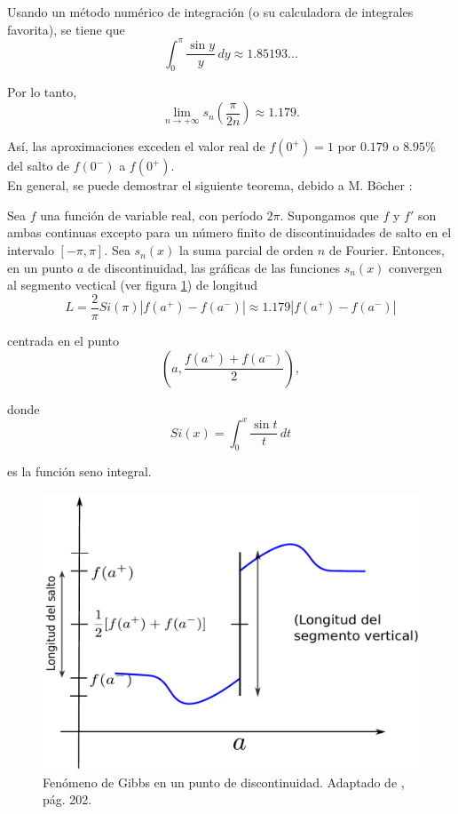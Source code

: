 Usando un método numérico de integración (o su calculadora de integrales favorita), se tiene que 
$$\int_0^{\pi} \frac{\sin y}{y} \,dy \approx 1.85193\dots$$

Por lo tanto, 
$$\lim_{n \to + \infty} s_n\left( \frac{\pi}{2n} \right) \approx 1.179.$$

Así, las aproximaciones exceden el valor real de $f(0^+) = 1$ por $0.179$ o $8.95\%$ del salto de $f(0^-)$ a $f(0^+)$. 
\\

En general, se puede demostrar el siguiente teorema, debido a M. B$\hat{\mbox{o}}$cher \cite{Bôcher}:

\begin{teorema}
Sea $f$ una función de variable real, con período $2\pi$. Supongamos que $f$ y $f'$ son ambas continuas excepto para un número finito de discontinuidades de salto en el intervalo $[-\pi,\pi]$. Sea $s_n(x)$ la suma parcial de orden $n$ de Fourier. Entonces, en un punto $a$ de discontinuidad, las gráficas de las funciones $s_n(x)$ convergen al segmento vectical (ver figura \ref{Gibbs}) de longitud 
$$L = \frac{2}{\pi} Si(\pi) |f(a^+) - f(a^-)| \approx 1.179 |f(a^+) - f(a^-)|$$

centrada en el punto 
$$\left(a, \frac{f(a^+) + f(a^-)}{2} \right),$$

donde 
$$Si(x) = \int_0^x \frac{\sin t}{t} \,dt$$

es la función seno integral.
\end{teorema}

\begin{figure}[H]
    \centering
    \includegraphics[scale = 0.55]{Figuras/Gibbs.pdf}
    \caption{Fenómeno de Gibbs en un punto de discontinuidad. Adaptado de \cite{UFRO}, pág. 202.}
    \label{Gibbs}
\end{figure}
 
